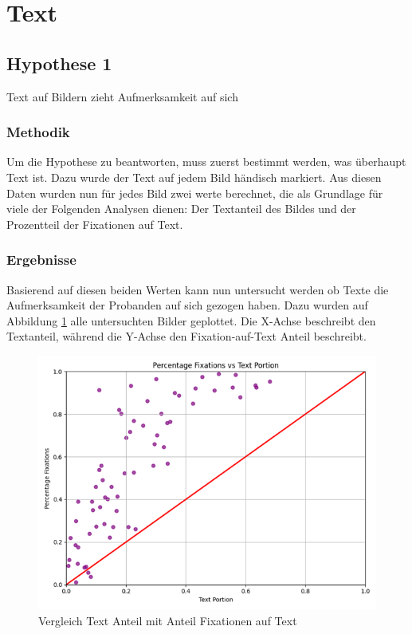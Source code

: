 \documentclass[
    language=german, %
    thesis=seminar, %
    supervisor=postdoc, %
    multiauthor=true, %
    ]{settings/csssa-thesis}
\begin{document}
\section{Text}

\subsection{Hypothese 1}
Text auf Bildern zieht Aufmerksamkeit auf sich

\subsubsection{Methodik}
Um die Hypothese zu beantworten, muss zuerst bestimmt werden, was überhaupt Text ist. 
Dazu wurde der Text auf jedem Bild händisch markiert. Aus diesen Daten wurden nun für 
jedes Bild zwei werte berechnet, die als Grundlage für viele der Folgenden Analysen dienen: 
Der Textanteil des Bildes und der Prozentteil der Fixationen auf Text. 

\subsubsection{Ergebnisse}
Basierend auf diesen beiden Werten kann nun untersucht werden ob Texte die Aufmerksamkeit 
der Probanden auf sich gezogen haben. Dazu wurden auf Abbildung \ref{fig:bild23} alle untersuchten Bilder geplottet. 
Die X-Achse beschreibt den Textanteil, während die Y-Achse den Fixation-auf-Text Anteil beschreibt. 

\begin{figure}[h]
    \centering
    \includegraphics[width=\linewidth,height=0.8\textheight,keepaspectratio]{figures/Bild28.png}
    \caption{Vergleich Text Anteil mit Anteil Fixationen auf Text}\label{fig:bild23}
\end{figure}
\end{document}
